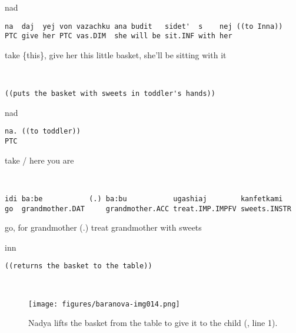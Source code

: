 \documentclass[output=paper,modfonts,nonflat]{langsci/langscibook}
\begin{document}
\vspace{-1mm}
%
\begin{mdframednoverticalspace}[style=firstfoc]
\begin{transbox}{1}{nad}
\begin{verbatim}
na  daj  yej von vazachku ana budit   sidet'  s    nej ((to Inna))
PTC give her PTC vas.DIM  she will be sit.INF with her
\end{verbatim}
take \{this\}, give her this little basket, she'll be sitting with it
\end{transbox}
\end{mdframednoverticalspace}
%
\begin{transbox}{~}{~}
\begin{verbatim}
((puts the basket with sweets in toddler's hands))
\end{verbatim}
\end{transbox}
%
%
\begin{mdframednoverticalspace}[style=firstfoc]
\begin{transbox}{3}{nad}
\begin{verbatim}
na. ((to toddler))
PTC
\end{verbatim}
take / here you are
\end{transbox}
\end{mdframednoverticalspace}
%
\begin{mdframednoverticalspace}[style=firstfoc]
\begin{transbox}{4}{~}
\begin{verbatim}
idi ba:be           (.) ba:bu           ugashiaj        kanfetkami
go  grandmother.DAT     grandmother.ACC treat.IMP.IMPFV sweets.INSTR
\end{verbatim}
go, for grandmother (.) treat grandmother with sweets
\end{transbox}
\end{mdframednoverticalspace}
%
\begin{transbox}{5}{inn}
\begin{verbatim}
((returns the basket to the table))
\end{verbatim}
\end{transbox}\\

\begin{figure}
\caption{Nadya lifts the basket from the table to give it to the child (, line 1).}
\label{fig:baranova:15}
\texttt{[image: figures/baranova-img014.png]}
\end{figure}
\end{document}
